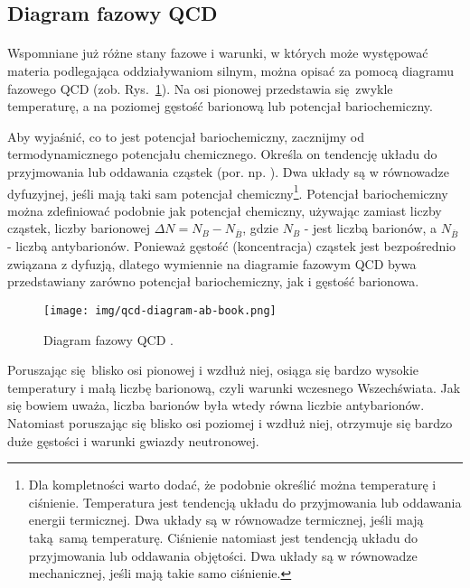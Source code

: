 \documentclass[a4paper,12pt]{article}
\begin{document}
\subsection{Diagram fazowy QCD}
\paragraph{}
Wspomniane już różne stany fazowe i warunki, w których może występować materia podlegająca oddziaływaniom silnym, można opisać za pomocą diagramu fazowego QCD (zob. Rys.~\ref{fig:qcd-diag-ab}). Na osi pionowej przedstawia się zwykle temperaturę, a na poziomej gęstość barionową lub potencjał bariochemiczny.

Aby wyjaśnić, co to jest potencjał bariochemiczny, zacznijmy od termodynamicznego potencjału chemicznego. Określa on tendencję układu do przyjmowania lub oddawania cząstek (por. np. \cite{schroeder}). Dwa układy są w równowadze dyfuzyjnej, jeśli mają taki sam potencjał chemiczny\footnote{Dla kompletności warto dodać, że podobnie określić można temperaturę i ciśnienie. Temperatura jest tendencją układu do przyjmowania lub oddawania energii termicznej. Dwa układy są w równowadze termicznej, jeśli mają taką samą temperaturę. Ciśnienie natomiast jest tendencją układu do przyjmowania lub oddawania objętości. Dwa układy są w równowadze mechanicznej, jeśli mają takie samo ciśnienie.}. Potencjał bariochemiczny można zdefiniować podobnie jak potencjał chemiczny, używając zamiast liczby cząstek, liczby barionowej $\Delta N = N_B - N_{\overline{B}}$, gdzie $N_B$ - jest liczbą barionów, a $N_{\overline{B}}$ - liczbą antybarionów. Ponieważ gęstość (koncentracja) cząstek jest bezpośrednio związana z dyfuzją, dlatego wymiennie na diagramie fazowym QCD bywa przedstawiany zarówno potencjał bariochemiczny, jak i gęstość barionowa.

\begin{figure}[H]
	\begin{center}
	\texttt{[image: img/qcd-diagram-ab-book.png]}
	\vspace{-0.1in}
		\caption{Diagram fazowy QCD \cite{Bzdak:2019pkr}. } \label{fig:qcd-diag-ab}
	\end{center}
\end{figure}

Poruszając się blisko osi pionowej i wzdłuż niej, osiąga się bardzo wysokie temperatury \quad \quad \quad i małą liczbę barionową, czyli warunki wczesnego Wszechświata. Jak się bowiem uważa, liczba barionów była wtedy równa liczbie antybarionów. Natomiast poruszając się blisko osi poziomej i wzdłuż niej, otrzymuje się bardzo duże gęstości i warunki gwiazdy neutronowej.
\end{document}
